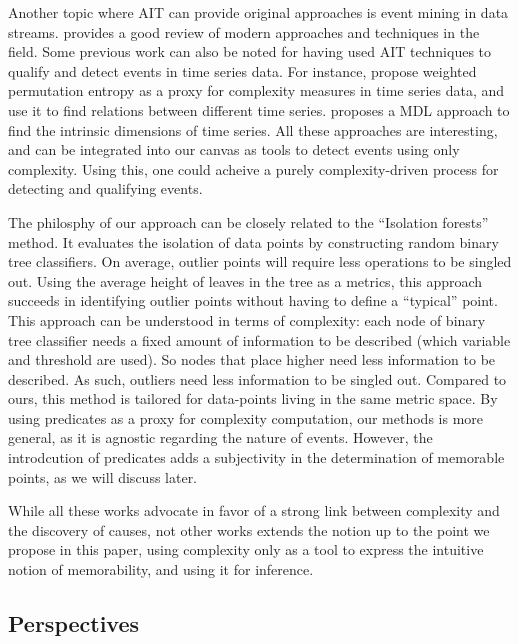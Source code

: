 \documentclass[entropy,article,submit,moreauthors,pdftex]{Definitions/mdpi}
\begin{document}
Another topic where AIT can provide original approaches is event mining in data streams.
\cite{aggarwal_outlier_2017} provides a good review of modern approaches and techniques
in the field. Some previous work can also be noted for having used AIT techniques to qualify and detect events in time series data. For instance, \cite{batista_complexity-invariant_2011,fadlallah_weighted-permutation_2013} propose weighted permutation entropy as a proxy for complexity measures in time series data, and use it to find relations between different time series. \cite{hu_discovering_2011} proposes a MDL approach to find the intrinsic dimensions of time series. All these approaches are interesting, and can be integrated into our canvas as tools to detect events using only complexity. Using this, one could acheive a purely complexity-driven process for detecting and qualifying events.

The philosphy of our approach can be closely related to the ``Isolation forests'' method\cite{liu_isolation_2008,hariri_extended_2021}. It evaluates the isolation of data points by constructing random binary tree classifiers. On average, outlier points will require less operations to be singled out. Using the average height of leaves in the tree as a metrics, this approach succeeds in identifying outlier points without having to define a ``typical'' point. This approach can be understood in terms of complexity: each node of binary tree classifier needs a fixed amount of information to be described (which variable and threshold are used). So nodes that place higher need less information to be described. As such, outliers need less information to be singled out. Compared to ours, this method is tailored for data-points living in the same metric space. By using predicates as a proxy for complexity computation, our methods is more general, as it is agnostic regarding the nature of events. However, the introdcution of predicates adds a subjectivity in the determination of memorable points, as we will discuss later.

While all these works advocate in favor of a strong link between complexity and the
discovery of causes, not other works extends the notion up to the point we propose in this paper, using complexity only as a tool to express the intuitive notion of memorability, and using it for inference.

\subsection{Perspectives}
\label{sec:future}
\end{document}
